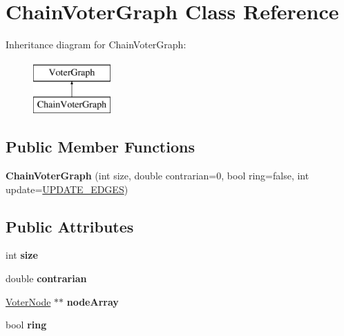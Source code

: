 \hypertarget{classChainVoterGraph}{\section{Chain\-Voter\-Graph Class Reference}
\label{classChainVoterGraph}
}
Inheritance diagram for Chain\-Voter\-Graph\-:\begin{figure}[H]
\begin{center}
\leavevmode
\includegraphics[height=2.000000cm]{classChainVoterGraph}
\end{center}
\end{figure}
\subsection*{Public Member Functions}
\begin{DoxyCompactItemize}
\item 
\hypertarget{classChainVoterGraph_af0e0e5327d26e67d46df0b33bb009c69}{{\bfseries Chain\-Voter\-Graph} (int size, double contrarian=0, bool ring=false, int update=\hyperlink{voter__graph_8hpp_ab3bec55c359e4ed771339c8bc61fc35aa01d100088352e1a7d3a34c9a66d0f951}{U\-P\-D\-A\-T\-E\-\_\-\-E\-D\-G\-E\-S})}\label{classChainVoterGraph_af0e0e5327d26e67d46df0b33bb009c69}

\end{DoxyCompactItemize}
\subsection*{Public Attributes}
\begin{DoxyCompactItemize}
\item 
\hypertarget{classChainVoterGraph_a03a3e2fb44bd8c4e0e1697545d4eff65}{int {\bfseries size}}\label{classChainVoterGraph_a03a3e2fb44bd8c4e0e1697545d4eff65}

\item 
\hypertarget{classChainVoterGraph_ace4b3a77876d38f216552e4b5bfaf32b}{double {\bfseries contrarian}}\label{classChainVoterGraph_ace4b3a77876d38f216552e4b5bfaf32b}

\item 
\hypertarget{classChainVoterGraph_a0b9e76e99e2666ca7e92ec757ce24d32}{\hyperlink{classVoterNode}{Voter\-Node} $\ast$$\ast$ {\bfseries node\-Array}}\label{classChainVoterGraph_a0b9e76e99e2666ca7e92ec757ce24d32}

\item 
\hypertarget{classChainVoterGraph_afb107128956fbedd499dfbfeef8fe14c}{bool {\bfseries ring}}\label{classChainVoterGraph_afb107128956fbedd499dfbfeef8fe14c}

\end{DoxyCompactItemize}


